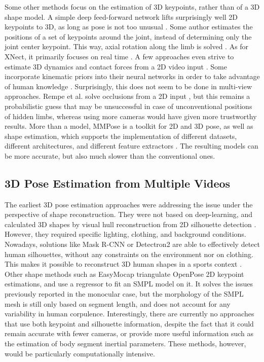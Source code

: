 Some other methods focus on the estimation of 3D keypoints, rather than of a 3D shape model. A simple deep feed-forward network lifts surprisingly well 2D keypoints to 3D, as long as pose is not too unusual \cite{Martinez2017}. Some author estimates the positions of a set of keypoints around the joint, instead of determining only the joint center keypoint. This way, axial rotation along the limb is solved \cite{Fisch2020}. As for XNect, it primarily focuses on real time \cite{Mehta2020}. A few approaches even strive to estimate 3D dynamics and contact forces from a 2D video input \cite{Li2019,Rempe2021,Louis2022}. Some incorporate kinematic priors into their neural networks in order to take advantage of human knowledge \cite{Xu2020a}. Surprisingly, this does not seem to be done in multi-view approaches. Rempe et al. solve occlusions from a 2D input \cite{Rempe2020}, but this remains a probabilistic guess that may be unsuccessful in case of unconventional positions of hidden limbs, whereas using more cameras would have given more trustworthy results. More than a model, MMPose is a toolkit for 2D and 3D pose, as well as shape estimation, which supports the implementation of different datasets, different architectures, and different feature extractors \cite{MMPose2020}. The resulting models can be more accurate, but also much slower than the conventional ones.


\subsection{3D Pose Estimation from Multiple Videos}

The earliest 3D pose estimation approaches were addressing the issue under the perspective of shape reconstruction. They were not based on deep-learning, and calculated 3D shapes by visual hull reconstruction from 2D silhouette detection \cite{Cheung2003,Corazza2006}. However, they required specific lighting, clothing, and background conditions. Nowadays, solutions like Mask R-CNN \cite{He2017} or Detectron2 \cite{Wu2019} are able to effectively detect human silhouettes, without any constraints on the environment nor on clothing. This makes it possible to reconstruct 3D human shapes in a sports context \cite{Chen2019}. Other shape methods such as EasyMocap \cite{Easymocap2021} triangulate OpenPose 2D keypoint estimations, and use a regressor to fit an SMPL model on it. It solves the issues previously reported in the monocular case, but the morphology of the SMPL mesh is still only based on segment length, and does not account for any variability in human corpulence. Interestingly, there are currently no approaches that use both keypoint and silhouette information, despite the fact that it could remain accurate with fewer cameras, or provide more useful information such as the estimation of body segment inertial parameters. These methods, however, would be particularly computationally intensive.

